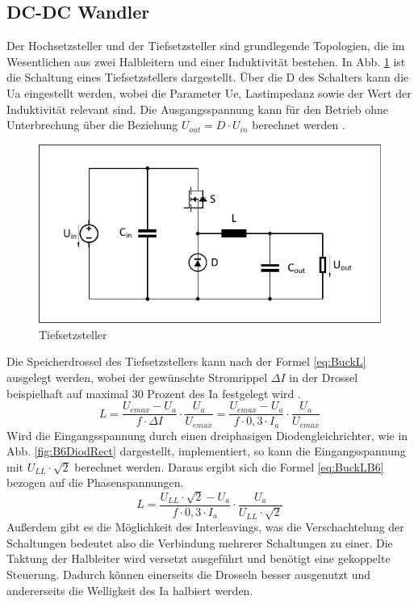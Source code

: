 		\subsection{DC-DC Wandler} \label{sec:Buck}
		Der Hochsetzsteller und der Tiefsetzsteller sind grundlegende Topologien, die im Wesentlichen aus zwei Halbleitern und einer Induktivität bestehen. In Abb. \ref{fig:buck} ist die Schaltung eines Tiefsetzstellers dargestellt. Über die \gls{D} des Schalters kann die \gls{Ua} eingestellt werden, wobei die Parameter \gls{Ue}, Lastimpedanz sowie der Wert der Induktivität relevant sind. Die Ausgangsspannung kann für den Betrieb ohne Unterbrechung über die Beziehung $U_{out}=D\cdot U_{in} $ berechnet werden \cite{schmidtwalter}.\\
		\begin{figure}
			\centering
			\includegraphics[width=0.7\linewidth]{content/Grafiken/Buck}
			\caption[Tiefsetzsteller]{Tiefsetzsteller}
			\label{fig:buck}
		\end{figure}
		Die Speicherdrossel des Tiefsetzstellers kann nach der Formel \ref{eq:BuckL} ausgelegt werden, wobei der gewünschte Stromrippel $\Delta I $ in der Drossel beispielhaft auf maximal 30 Prozent des \gls{Ia} festgelegt wird \cite{schmidtwalter}.
		\begin{equation}
			\label{eq:BuckL}
			L=\dfrac{U_{emax}-U_{a}}{f\cdot \Delta I}\cdot \dfrac{U_{a}}{U_{emax}} = \dfrac{U_{emax}-U_{a}}{f\cdot 0,3 \cdot I_{a}}\cdot \dfrac{U_{a}}{U_{emax}}
		\end{equation}
		Wird die Eingangsspannung durch einen dreiphasigen Diodengleichrichter, wie in Abb. \ref{fig:B6DiodRect} dargestellt,  implementiert, so kann die Eingangsspannung mit $U_{LL} \cdot \sqrt{2}$ berechnet werden. Daraus ergibt sich die Formel \ref{eq:BuckLB6} bezogen auf die Phasenspannungen. \\
		\begin{equation}
			\label{eq:BuckLB6}
			L=\dfrac{U_{LL} \cdot \sqrt{2}-U_{a}}{f\cdot 0,3 \cdot I_{a}}\cdot \dfrac{U_{a}}{U_{LL} \cdot \sqrt{2}}
		\end{equation}
		Außerdem gibt es die Möglichkeit des Interleavings, was die Verschachtelung der Schaltungen bedeutet also die Verbindung mehrerer Schaltungen zu einer. Die Taktung der Halbleiter wird versetzt ausgeführt und benötigt eine gekoppelte Steuerung. Dadurch können einerseits die Drosseln besser ausgenutzt und andererseits die Welligkeit des \gls{Ia} halbiert werden. 
		
